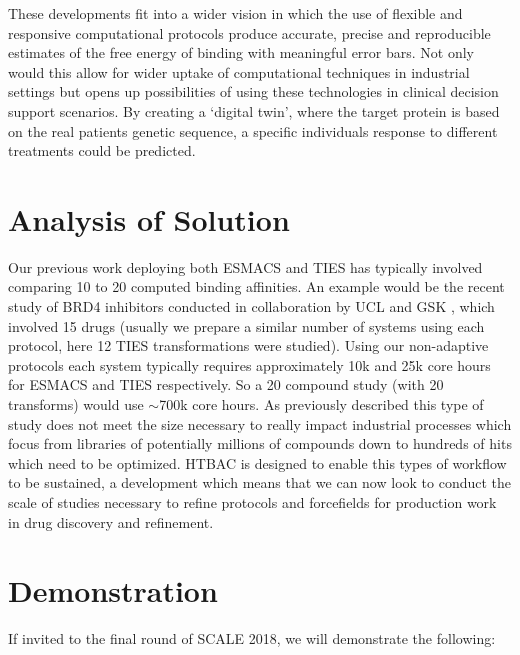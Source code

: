 \documentclass[conference]{IEEEtran}
\begin{document}
These developments fit into a wider vision in which the use of
flexible and responsive computational protocols produce accurate,
precise and reproducible estimates of the free energy of binding with
meaningful error bars. Not only would this allow for wider uptake of
computational techniques in industrial settings but opens up possibilities
of using these technologies in clinical decision support scenarios. By creating
a `digital twin', where the target protein is based on the real patients
genetic sequence, a specific individuals response to different
treatments could be predicted.


\section{Analysis of Solution}\label{sec:analysis}

Our previous work deploying both ESMACS and TIES has typically involved comparing 10 to 20 computed
binding affinities.
An example would be the recent study of BRD4 inhibitors conducted in collaboration by UCL and GSK \cite{Wan2017brd4}, which involved 15 drugs (usually we prepare a similar number of systems using each protocol, here 12 TIES transformations were studied).
Using our non-adaptive protocols each system typically requires approximately 10k and 25k core hours for ESMACS and TIES respectively.
So a 20 compound study (with 20 transforms) would use $\sim$700k core hours.
As previously described this type of study does not meet the size necessary to really impact industrial processes which focus from libraries of potentially millions of compounds down to hundreds of hits which need to be optimized.
HTBAC is designed to enable this types of workflow to be sustained, a development which means that we can now look to conduct the scale of studies necessary to refine protocols and forcefields for production work in drug discovery and refinement.



\section{Demonstration}\label{sec:demo}

If invited to the final round of SCALE 2018, we will demonstrate the following:
\end{document}
